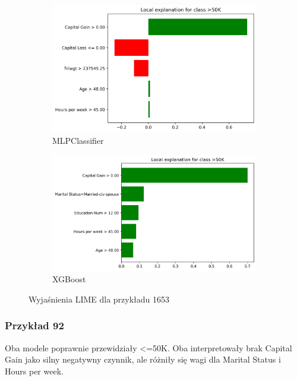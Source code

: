 \documentclass[12pt,a4paper]{article}
\begin{document}
\begin{figure}[H]
  \centering
  \begin{subfigure}{0.45\textwidth}
    \centering
    \includegraphics[width=\textwidth]{../out/mlp-1653.png}
    \caption{MLPClassifier}
  \end{subfigure}
  \begin{subfigure}{0.45\textwidth}
    \centering
    \includegraphics[width=\textwidth]{../out/xgboost-1653.png}
    \caption{XGBoost}
  \end{subfigure}
  \caption{Wyjaśnienia LIME dla przykładu 1653}
\end{figure}

\subsubsection{Przykład 92}

Oba modele poprawnie przewidziały <=50K. Oba interpretowały brak Capital Gain jako silny negatywny czynnik, ale różniły się wagi dla Marital Status i Hours per week.
\end{document}

